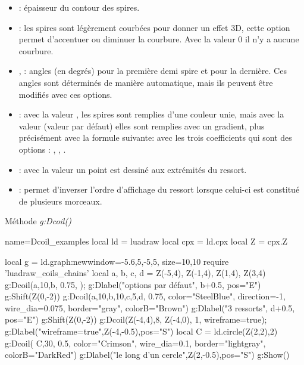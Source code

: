 \begin{itemize}
\begin{itemize}
            \item {} : épaisseur du contour des spires.
            \item {} : les spires sont légèrement courbées pour donner un effet 3D, cette option permet d'accentuer ou diminuer la courbure. Avec la valeur $0$ il n'y a aucune courbure.
            \item {},  : angles (en degrés) pour la première demi spire et pour la dernière. Ces angles sont déterminés de manière automatique, mais ils peuvent être modifiés avec ces options.
            \item {} : avec la valeur \true, les spires sont remplies d'une couleur unie, mais avec la valeur \false (valeur par défaut) elles sont remplies avec un gradient, plus précisément avec la formule suivante:
            avec les trois coefficients qui sont des options :  , , .
            \item {} : avec la valeur \true un point est dessiné aux extrémités du ressort.
            \item {} : permet d'inverser l'ordre d'affichage du ressort lorsque celui-ci est constitué de plusieurs morceaux.
        \end{itemize}
        
\begin{demo}{Méthode \emph{g:Dcoil()}}
\begin{luadraw}{name=Dcoil_examples}
local ld = luadraw
local cpx = ld.cpx
local Z = cpx.Z

local g = ld.graph:new{window={-5.6,5,-5,5}, size={10,10}}
require 'luadraw_coils_chains'
local a, b, c, d = Z(-5,4), Z(-1,4), Z(1,4), Z(3,4)
g:Dcoil({a,10,b}, 0.75, {}); g:Dlabel("options par défaut", b+0.5, {pos="E"})
g:Shift(Z(0,-2))
g:Dcoil({a,10,b,10,c,5,d}, 0.75, {color="SteelBlue", direction=-1, wire_dia=0.075, 
    border="gray", colorB="Brown"})
g:Dlabel("3 ressorts", d+0.5, {pos="E"})
g:Shift(Z(0,-2))
g:Dcoil({Z(-4,4),8, Z(-4,0)}, 1, {wireframe=true}); g:Dlabel("wireframe=true",Z(-4,-0.5),{pos="S"})
local C = ld.circle(Z(2,2),2)
g:Dcoil( {C,30}, 0.5, {color="Crimson", wire_dia=0.1, border="lightgray", colorB="DarkRed"})
g:Dlabel("le long d'un cercle",Z(2,-0.5),{pos="S"})
g:Show()
\end{luadraw}
\end{demo}


\end{itemize}
